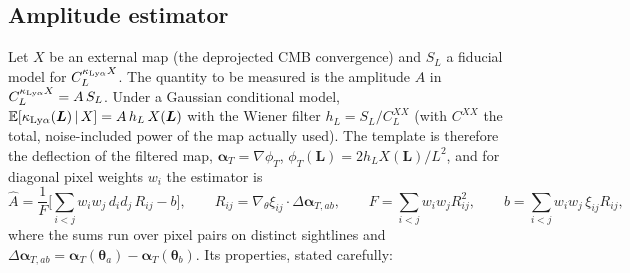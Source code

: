 \documentclass[11pt,a4paper]{article}
\newcommand{\vL}{\bm{L}}
\newcommand{\vth}{\bm{\theta}}
\newcommand{\klya}{\kappa_{{\rm Ly}\alpha}}
\begin{document}
\subsection{Amplitude estimator}
Let $X$ be an external map (the deprojected CMB convergence) and $S_L$ a fiducial model for $C_L^{\klya X}$. The quantity to be measured is the amplitude $A$ in $C_L^{\klya X}=A\,S_L$. Under a Gaussian conditional model, $\mathbb E[\klya(\vL)\,|\,X]=A\,h_L\,X(\vL)$ with the Wiener filter $h_L=S_L/C_L^{XX}$ (with $C^{XX}$ the total, noise-included power of the map actually used). The template is therefore the deflection of the filtered map, $\bm\alpha_T=\nabla\phi_T$, $\phi_T(\vL)=2h_LX(\vL)/L^2$, and for diagonal pixel weights $w_i$ the estimator is
\begin{equation}
\hat A=\frac{1}{F}\Big[\sum_{i<j}w_iw_j\,d_id_j\,R_{ij}-b\Big],\qquad
R_{ij}=\nabla_\theta\xi_{ij}\cdot\Delta\bm\alpha_{T,ab},\qquad
F=\sum_{i<j}w_iw_jR_{ij}^2,\qquad b=\sum_{i<j}w_iw_j\,\xi_{ij}R_{ij},
\label{eq:Ahat}
\end{equation}
where the sums run over pixel pairs on distinct sightlines and $\Delta\bm\alpha_{T,ab}=\bm\alpha_T(\vth_a)-\bm\alpha_T(\vth_b)$. Its properties, stated carefully:
\end{document}
